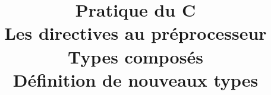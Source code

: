 \title{Pratique du C \\ 
 Les directives au pr\'eprocesseur \\
 Types compos\'es \\
 D\'efinition de nouveaux types 
}
